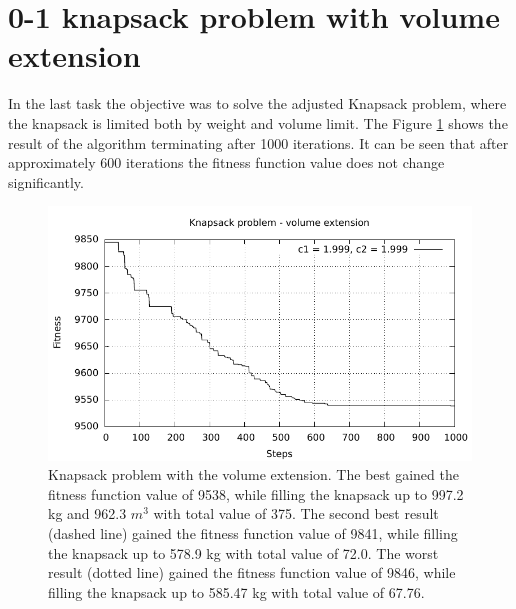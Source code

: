 \section{0-1 knapsack problem with volume extension}
In the last task the objective was to solve the adjusted Knapsack problem, where the knapsack is limited both by weight and volume limit. The Figure \ref{fig:knaspack_volume} shows the result of the algorithm terminating after 1000 iterations. It can be seen that after approximately 600 iterations the fitness function value does not change significantly.

\begin{figure}[!h]
	\centering
		\includegraphics[width=15cm]{img/4a.pdf}
	\caption{Knapsack problem with the volume extension. The best gained the fitness function value of 9538, while filling the knapsack up to 997.2 kg and 962.3 $m^{3}$ with total value of 375. The second best result (dashed line) gained the fitness function value of 9841, while filling the knapsack up to 578.9 kg with total value of 72.0. The worst result (dotted line) gained the fitness function value of 9846, while filling the knapsack up to 585.47 kg with total value of 67.76.}
	\label{fig:knaspack_volume}
\end{figure}